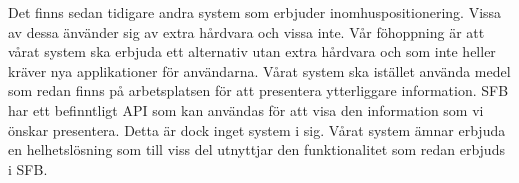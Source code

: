 \documentclass[a4paper,12pt]{article}
\begin{document}
Det finns sedan tidigare andra system som erbjuder inomhuspositionering. Vissa av dessa änvänder sig av extra hårdvara och vissa inte. Vår föhoppning är att vårat system ska erbjuda ett alternativ utan extra hårdvara och som inte heller kräver nya applikationer för användarna. Vårat system ska istället använda medel som redan finns på arbetsplatsen för att presentera ytterliggare information.
SFB har ett befinntligt API som kan användas för att visa den information som vi önskar presentera. Detta är dock inget system i sig. Vårat system ämnar erbjuda en helhetslösning som till viss del utnyttjar den funktionalitet som redan erbjuds i SFB.








\end{document}
